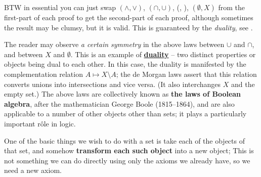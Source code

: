 \begin{note}
BTW in essential you can just swap \((\land, \lor)\), \((\cap, \cup)\), (, ), \((\emptyset, X)\) from the first-part of each proof to get the second-part of each proof, although sometimes the result may be clumsy, but it is valid. This is guaranteed by the \emph{duality}, see .
\end{note}

\begin{remark} \label{remark 3.1.30}
The reader may observe \emph{a certain symmetry} in the above laws between \(\cup\) and \(\cap\), and between \(X\) and \(\emptyset\). This is an example of \href{https://www.wikiwand.com/en/Duality_(mathematics)}{\textbf{duality}} -- two distinct properties or objects being dual to each other. In this case, the duality is manifested by the complementation relation \(A \mapsto X \setminus A \); the de Morgan laws assert that this relation converts unions into intersections and vice versa. (It also interchanges \(X\) and the empty set.) The above laws are collectively known as \textbf{the laws of Boolean algebra}, after the mathematician George Boole (1815–1864), and are also applicable to a number of other objects other than sets; it plays a
particularly important r\^{o}le in logic.
\end{remark}

\begin{note}
One of the basic things we wish to do with a set is take each of the objects of that set, and somehow \textbf{transform each such object} into a new object; This is not something we can do directly using only the axioms we already have, so we need a new axiom.
\end{note}


